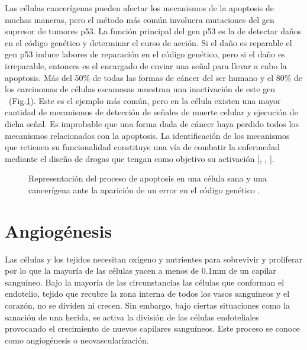 \hspace{.1cm}Las células cancerígenas pueden afectar los mecanismos de la apoptosis de muchas maneras, pero el método más común involucra mutaciones del gen supresor de tumores p53. La función principal del gen p53 es la de detectar daños en el código genético y determinar el curso de acción. Si el daño es reparable el gen p53 induce labores de reparación en el código genético, pero si el daño es irreparable, entonces es el encargado de enviar una señal para llevar a cabo la apoptosis. Más del 50\% de todas las formas de cáncer del ser humano y el 80\% de los carcinomas de células escamosas muestran una inactivación de este gen ~(Fig.\ref{fig-apoptosis}). Este es el ejemplo más común, pero en la célula existen una mayor cantidad de mecanismos de detección de señales de muerte celular y ejecución de dicha señal. Es improbable que una forma dada de cáncer haya perdido todos los mecanismos relacionados con la apoptosis. La identificación de los mecanismos que retienen su funcionalidad constituye una vía de combatir la enfermedad mediante el diseño de drogas que tengan como objetivo su activación [\cite{robins}, \cite{hanahan}, \cite{cancerbook}].

\begin{figure}[!ht]
\begin{center}
\end{center}\vspace*{-0.6cm}
\caption[Representaci\'on del proceso de apoptosis en una c\'elula sana y una cancer\'igena ante la aparici\'on de un error en el c\'odigo gen\'etico]{Representaci\'on del proceso de apoptosis en una c\'elula sana y una cancer\'igena ante la aparici\'on de un error en el c\'odigo gen\'etico \cite{viabarre2019}.}
\label{fig-apoptosis}
\end{figure}

\section{Angiogénesis}
\hspace{.1cm}Las células y los tejidos necesitan oxígeno y nutrientes para sobrevivir y proliferar por lo que la mayoría de las células yacen a menos de 0.1mm de un capilar sanguíneo. Bajo la mayoría de las circunstancias las células que conforman el endotelio, tejido que recubre la zona interna de todos los vasos sanguíneos y el corazón, no se dividen ni crecen. Sin embargo, bajo ciertas situaciones como la sanación de una herida, se activa la división de las células endoteliales provocando el crecimiento de nuevos capilares sanguíneos. Este proceso se conoce como angiogénesis o neovascularización.

